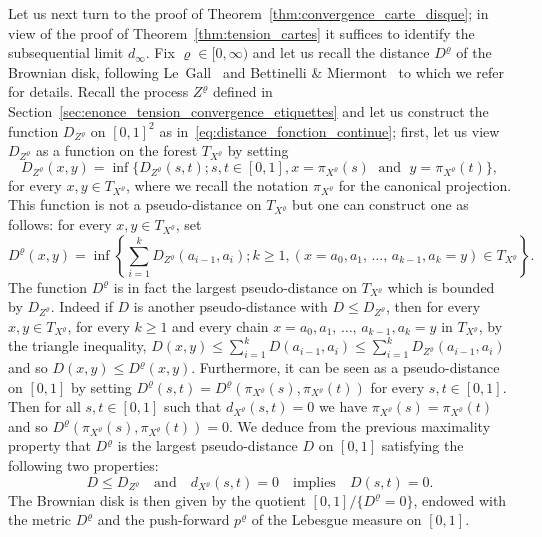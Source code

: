 \documentclass[10pt]{amsart}
\theoremstyle{definition}\newtheorem{defi}[theo]{Definition}\newtheorem{rema}[theo]{Remark}\newtheorem{exam}[theo]{Example}\newtheorem{exem}[theo]{Example}\newtheorem{nota}[theo]{Notation}
\newcommand{\1}{\ensembles{1}}
\renewcommand{\le}{\leqslant}
\renewcommand{\ge}{\geqslant}
\newcommand{\dBmap}{D}
\newcommand{\pBmap}{p}
\newcommand{\CRT}{T}
\newcommand{\dCRT}{d}
\providecommand{\?}{}
\begin{document}
Let us next turn to the proof of Theorem~\ref{thm:convergence_carte_disque}; in view of the proof of Theorem~\ref{thm:tension_cartes} it suffices to identify the subsequential limit $d_\infty$. Fix $\varrho \in [0, \infty)$ and let us recall the distance $\dBmap^\varrho$ of the Brownian disk, following Le~Gall~\cite{LG07} and Bettinelli \& Miermont~\cite{BM17} to which we refer for details. Recall the process $Z^\varrho$ defined in Section~\ref{sec:enonce_tension_convergence_etiquettes} and let us construct the function $D_{Z^\varrho}$ on $[0,1]^2$ as in~\eqref{eq:distance_fonction_continue}; first, let us view $D_{Z^\varrho}$ as a function on the forest $\CRT_{X^\varrho}$ by setting
\[
D_{Z^\varrho}(x,y) = \inf\big\{D_{Z^\varrho}(s,t) ; s,t \in [0,1], x=\pi_{X^\varrho}(s)\;\text{ and }\; y=\pi_{X^\varrho}(t)\big\},
\]
for every $x, y \in \CRT_{X^\varrho}$, where we recall the notation $\pi_{X^\varrho}$ for the canonical projection. This function is not a pseudo-distance on $\CRT_{X^\varrho}$ but one can construct one as follows: for every $x, y \in \CRT_{X^\varrho}$, set
\[
\dBmap^\varrho(x,y) = \inf\left\{\sum_{i=1}^k D_{Z^\varrho}(a_{i-1}, a_i) ; k \ge 1, \left(x=a_0, a_1,\,\dots,\, a_{k-1}, a_k=y\right) \in \CRT_{X^\varrho}\right\}.
\]
The function $\dBmap^\varrho$ is in fact the largest pseudo-distance on $\CRT_{X^\varrho}$ which is bounded by $D_{Z^\varrho}$. Indeed if $D$ is another pseudo-distance with $D \le D_{Z^\varrho}$, then for every $x,y \in \CRT_{X^\varrho}$, for every $k \ge 1$ and every chain $x=a_0, a_1,\,\dots,\,a_{k-1}, a_k=y$ in $\CRT_{X^\varrho}$, by the triangle inequality, $D(x, y) \le \sum_{i=1}^k D(a_{i-1}, a_i) \le \sum_{i=1}^k D_{Z^\varrho}(a_{i-1}, a_i)$ and so $D(x, y) \le \dBmap^\varrho(x, y)$. Furthermore, it can be seen as a pseudo-distance on $[0,1]$ by setting $\dBmap^\varrho(s,t) = \dBmap^\varrho(\pi_{X^\varrho}(s),\pi_{X^\varrho}(t))$ for every $s,t \in [0,1]$. Then for all $s,t \in [0,1]$ such that $\dCRT_{X^\varrho}(s,t) = 0$ we have $\pi_{X^\varrho}(s) = \pi_{X^\varrho}(t)$ and so $\dBmap^\varrho(\pi_{X^\varrho}(s),\pi_{X^\varrho}(t)) = 0$. We deduce from the previous maximality property that $\dBmap^\varrho$ is the largest pseudo-distance $D$ on $[0,1]$ satisfying the following two properties:
\[
D \le D_{Z^\varrho}
\quad\text{and}\quad
\dCRT_{X^\varrho}(s,t) = 0 \quad\text{implies}\quad D(s,t) = 0.
\]
The Brownian disk is then given by the quotient $[0,1] / \{\dBmap^\varrho=0\}$, endowed with the metric $\dBmap^\varrho$ and the push-forward $\pBmap^\varrho$ of the Lebesgue measure on $[0,1]$.
\end{document}
